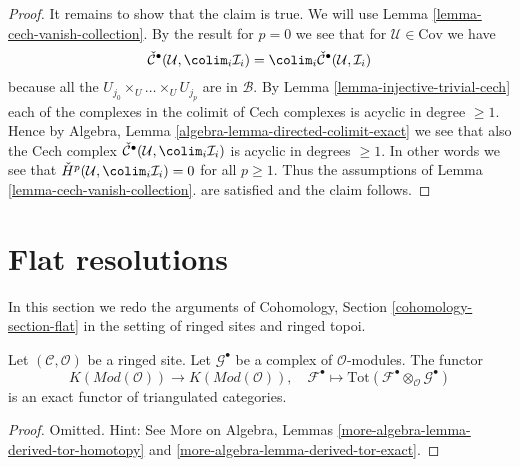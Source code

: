 \begin{proof}
\medskip\noindent
It remains to show that the claim is true. We will use
Lemma \ref{lemma-cech-vanish-collection}.
By the result for $p = 0$ we see that for $\mathcal{U} \in \text{Cov}$
we have
$$
\check{\mathcal{C}}^\bullet(\mathcal{U}, \colim_i \mathcal{I}_i)
=
\colim_i \check{\mathcal{C}}^\bullet(\mathcal{U}, \mathcal{I}_i)
$$
because all the $U_{j_0} \times_U \ldots \times_U U_{j_p}$
are in $\mathcal{B}$. By
Lemma \ref{lemma-injective-trivial-cech}
each of the complexes in the colimit of Cech complexes is
acyclic in degree $\geq 1$. Hence by
Algebra, Lemma \ref{algebra-lemma-directed-colimit-exact}
we see that also the Cech complex
$\check{\mathcal{C}}^\bullet(\mathcal{U}, \colim_i \mathcal{I}_i)$
is acyclic in degrees $\geq 1$. In other words we see that
$\check{H}^p(\mathcal{U}, \colim_i \mathcal{I}_i) = 0$
for all $p \geq 1$. Thus the assumptions of
Lemma \ref{lemma-cech-vanish-collection}.
are satisfied and the claim follows.
\end{proof}
















\section{Flat resolutions}
\label{section-flat}

\noindent
In this section we redo the arguments of
Cohomology, Section \ref{cohomology-section-flat}
in the setting of ringed sites and ringed topoi.

\begin{lemma}
\label{lemma-derived-tor-exact}
Let $(\mathcal{C}, \mathcal{O})$ be a ringed site.
Let $\mathcal{G}^\bullet$ be a complex of $\mathcal{O}$-modules.
The functor
$$
K(\textit{Mod}(\mathcal{O}))
\longrightarrow
K(\textit{Mod}(\mathcal{O})),
\quad
\mathcal{F}^\bullet \longmapsto
\text{Tot}(\mathcal{F}^\bullet \otimes_\mathcal{O} \mathcal{G}^\bullet)
$$
is an exact functor of triangulated categories.
\end{lemma}

\begin{proof}
Omitted. Hint: See
More on Algebra, Lemmas \ref{more-algebra-lemma-derived-tor-homotopy} and
\ref{more-algebra-lemma-derived-tor-exact}.
\end{proof}

